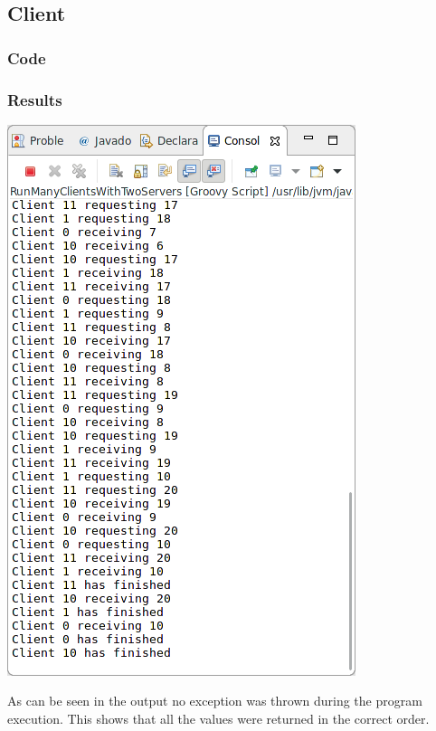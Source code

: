 \subsection{Client}

\subsubsection*{Code}


\subsubsection*{Results}

\includegraphics[width=\textwidth/2]{img/screenshots/8-1.png}

As can be seen in the output no exception was thrown during the program execution.  This shows that all the values were returned in the correct order.
